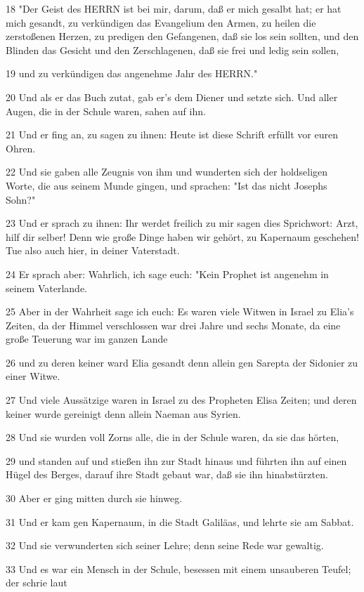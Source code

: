 \par 18 "Der Geist des HERRN ist bei mir, darum, daß er mich gesalbt hat; er hat mich gesandt, zu verkündigen das Evangelium den Armen, zu heilen die zerstoßenen Herzen, zu predigen den Gefangenen, daß sie los sein sollten, und den Blinden das Gesicht und den Zerschlagenen, daß sie frei und ledig sein sollen,
\par 19 und zu verkündigen das angenehme Jahr des HERRN."
\par 20 Und als er das Buch zutat, gab er's dem Diener und setzte sich. Und aller Augen, die in der Schule waren, sahen auf ihn.
\par 21 Und er fing an, zu sagen zu ihnen: Heute ist diese Schrift erfüllt vor euren Ohren.
\par 22 Und sie gaben alle Zeugnis von ihm und wunderten sich der holdseligen Worte, die aus seinem Munde gingen, und sprachen: "Ist das nicht Josephs Sohn?"
\par 23 Und er sprach zu ihnen: Ihr werdet freilich zu mir sagen dies Sprichwort: Arzt, hilf dir selber! Denn wie große Dinge haben wir gehört, zu Kapernaum geschehen! Tue also auch hier, in deiner Vaterstadt.
\par 24 Er sprach aber: Wahrlich, ich sage euch: "Kein Prophet ist angenehm in seinem Vaterlande.
\par 25 Aber in der Wahrheit sage ich euch: Es waren viele Witwen in Israel zu Elia's Zeiten, da der Himmel verschlossen war drei Jahre und sechs Monate, da eine große Teuerung war im ganzen Lande
\par 26 und zu deren keiner ward Elia gesandt denn allein gen Sarepta der Sidonier zu einer Witwe.
\par 27 Und viele Aussätzige waren in Israel zu des Propheten Elisa Zeiten; und deren keiner wurde gereinigt denn allein Naeman aus Syrien.
\par 28 Und sie wurden voll Zorns alle, die in der Schule waren, da sie das hörten,
\par 29 und standen auf und stießen ihn zur Stadt hinaus und führten ihn auf einen Hügel des Berges, darauf ihre Stadt gebaut war, daß sie ihn hinabstürzten.
\par 30 Aber er ging mitten durch sie hinweg.
\par 31 Und er kam gen Kapernaum, in die Stadt Galiläas, und lehrte sie am Sabbat.
\par 32 Und sie verwunderten sich seiner Lehre; denn seine Rede war gewaltig.
\par 33 Und es war ein Mensch in der Schule, besessen mit einem unsauberen Teufel; der schrie laut
